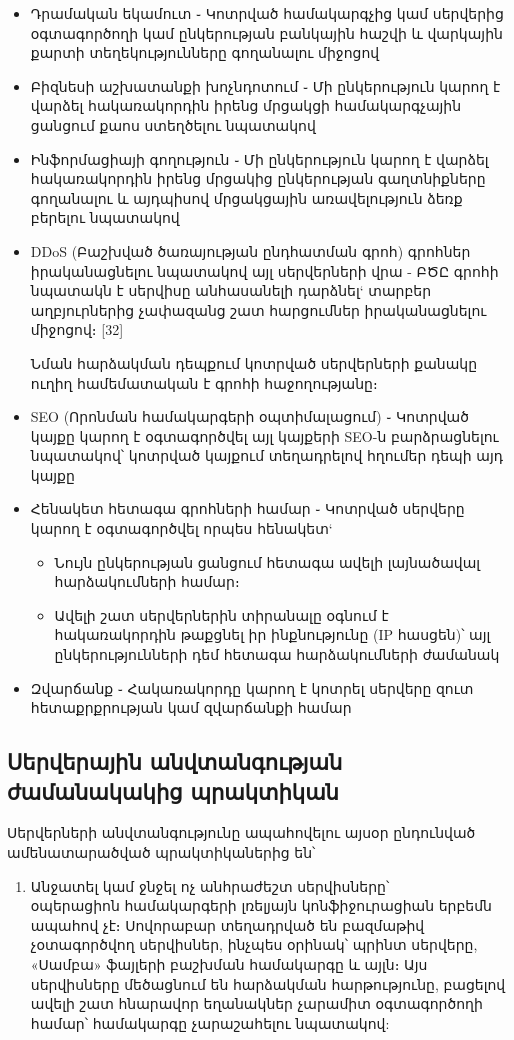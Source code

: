 \documentclass[12pt]{article}
\begin{document}
\begin{sloppypar}
\begin{itemize}
\item Դրամական եկամուտ ֊ Կոտրված համակարգչից կամ սերվերից օգտագործողի
    կամ ընկերության բանկային հաշվի և վարկային քարտի տեղեկությունները
    գողանալու միջոցով
\item Բիզնեսի աշխատանքի խոչնդոտում ֊ Մի ընկերություն կարող է վարձել
    հակառակորդին իրենց մրցակցի համակարգչային ցանցում քաոս ստեղծելու
    նպատակով
\item Ինֆորմացիայի գողություն ֊ Մի ընկերություն կարող է վարձել
    հակառակորդին իրենց մրցակից ընկերության գաղտնիքները գողանալու և
    այդպիսով մրցակցային առավելություն ձեռք բերելու նպատակով
\item DDoS (Բաշխված ծառայության ընդհատման գրոհ) գրոհներ
    իրականացնելու նպատակով այլ սերվերների վրա - 
	ԲԾԸ գրոհի նպատակն է սերվիսը անհասանելի դարձնել`
	տարբեր աղբյուրներից չափազանց շատ հարցումներ
	իրականացնելու միջոցով։ [32]
	
    Նման հարձակման դեպքում կոտրված սերվերների քանակը
	ուղիղ համեմատական է գրոհի հաջողությանը։
\item SEO (Որոնման համակարգերի օպտիմալացում) ֊ Կոտրված կայքը կարող է
    օգտագործվել այլ կայքերի SEO-ն բարձրացնելու նպատակով՝ կոտրված կայքում
    տեղադրելով հղումեր դեպի այդ կայքը
\item Հենակետ հետագա գրոհների համար ֊ Կոտրված սերվերը կարող է օգտագործվել
	որպես հենակետ`
	\begin{itemize}
	\item Նույն ընկերության ցանցում հետագա ավելի լայնածավալ հարձակումների
		համար։
	\item Ավելի շատ սերվերներին տիրանալը օգնում է հակառակորդին թաքցնել
		իր ինքնությունը (IP հասցեն)՝ այլ ընկերությունների դեմ հետագա
		հարձակումների ժամանակ
	\end{itemize}
\item Զվարճանք ֊ Հակառակորդը կարող է կոտրել սերվերը զուտ հետաքրքրության կամ
    զվարճանքի համար
\end{itemize}


\subsection{Սերվերային անվտանգության ժամանակակից պրակտիկան}


Սերվերների անվտանգությունը ապահովելու այսօր ընդունված ամենատարածված
պրակտիկաներից են՝

\begin{enumerate}
\item Անջատել կամ ջնջել ոչ անհրաժեշտ սերվիսները՝\\
    օպերացիոն համակարգերի լռելյայն կոնֆիջուրացիան երբեմն ապահով չէ։
    Սովորաբար տեղադրված են բազմաթիվ չօտագործվող սերվիսներ, ինչպես
    օրինակ՝ պրինտ սերվերը, «Սամբա» ֆայլերի բաշխման համակարգը և այլն։
	Այս սերվիսները
    մեծացնում են հարձակման հարթությունը, բացելով ավելի շատ հնարավոր եղանակներ
    չարամիտ օգտագործողի համար՝ համակարգը չարաշահելու նպատակով:


\end{enumerate}
\end{sloppypar}
\end{document}
